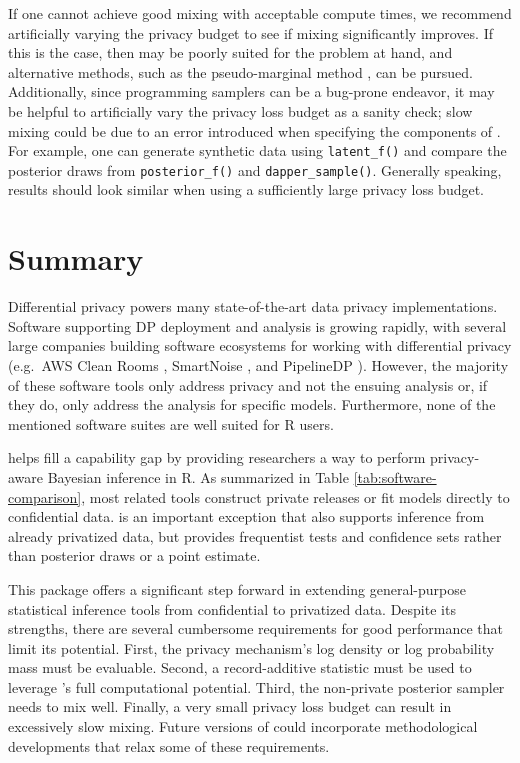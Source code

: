 If one cannot achieve good mixing with acceptable compute
times, we recommend artificially varying the privacy
budget to see if mixing significantly improves.
If this is the case, then  may be poorly suited for the problem at hand,
and alternative methods, such as the pseudo-marginal method \citep{Andrieu2009},
can be pursued.
Additionally, since programming samplers can be a bug-prone endeavor, it may be helpful
to artificially vary the privacy loss budget as a
sanity check; slow mixing could be due to an
error introduced when specifying the components of . For example, one can
generate synthetic data using \texttt{latent\_f()} and compare the posterior
draws from \texttt{posterior\_f()} and \texttt{dapper\_sample()}. Generally speaking,
results should look similar when using a sufficiently large privacy loss budget.

\section{Summary}\label{sec:summary}

Differential privacy powers many state-of-the-art data privacy
implementations. Software supporting DP deployment and analysis
is growing rapidly, with several large companies building software ecosystems for
working with differential privacy
(e.g.~AWS Clean Rooms \citep{awscleanrooms2024}, SmartNoise \citep{smartnoise2024}, and PipelineDP \citep{pipelinedp2022}).
However, the majority of these software tools only address privacy and not the
ensuing analysis or, if they do, only address the analysis for specific models.
Furthermore, none of the mentioned software suites are well suited for R users.

 helps fill a capability gap by providing researchers a
way to perform privacy-aware Bayesian inference in R. As summarized in Table
\ref{tab:software-comparison}, most related tools construct private releases
or fit models directly to confidential data.  is an
important exception that also supports inference from already privatized data,
but provides frequentist tests and confidence sets rather than posterior draws
or a point estimate.

This package offers a significant step forward in extending general-purpose statistical inference tools from confidential to privatized data.
Despite its strengths, there are
several cumbersome requirements for good performance that limit its potential.
First, the privacy mechanism's log density or log probability mass must be evaluable.
Second, a record-additive
statistic must be used to leverage 's full computational potential.
Third, the non-private posterior sampler needs to mix well. Finally, a very small privacy loss budget can result in excessively slow mixing.
Future versions of  could incorporate methodological developments that relax some of these requirements.

